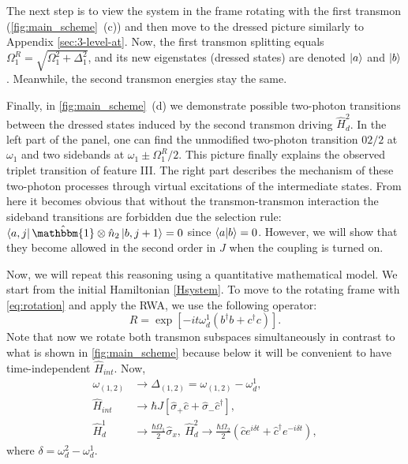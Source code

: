 \documentclass[%
 aps, prx,
 amsmath,amssymb,
 reprint,%
superscriptaddress
]{revtex4-2}
\begin{document}
The next step is to view the system in the frame 
rotating with the first transmon 
(\autoref{fig:main_scheme}~(c)) and then move to 
the  dressed picture similarly to Appendix 
\ref{sec:3-level-at}. Now, the first transmon 
splitting equals $\Omega_{1}^R = 
\sqrt{\Omega_1^2+\Delta_1^2}$, and its new 
eigenstates (dressed states) are denoted 
$\ket{a}$ and $\ket{b}$. Meanwhile, the second 
transmon energies stay the same.


Finally, in \autoref{fig:main_scheme}~(d) we demonstrate possible two-photon transitions between the dressed states induced by the second transmon driving $\hat H_{d}^2$. In the left part of the panel, one can find the unmodified two-photon transition $02/2$ at $\omega_1$ and two sidebands at $\omega_1 \pm \Omega_1^R/2$. This picture finally explains the observed triplet transition of feature III. The right part describes the mechanism of these two-photon processes through virtual excitations of the intermediate states. From here it becomes obvious that without the transmon-transmon interaction the sideband transitions are forbidden due the selection rule: $\bra{a,j}\hat{\mathbbm{1}}\otimes \hat n_2 \ket{b, j+1} = 0$ since $\braket{a}{b} = 0$. However, we will show that they become allowed in the second order in $J$ when the coupling is turned on.

Now, we will repeat this reasoning using a 
quantitative mathematical model. We start from 
the initial Hamiltonian \autoref{Hsystem}. To 
move to the rotating frame with 
\autoref{eq:rotation} and apply the RWA, we use 
the following operator:
\begin{equation}
R = \exp[-it \omega_d^1 
(b^{\dagger}b+c^{\dagger}c)].
\end{equation}  
Note that now we rotate both transmon subspaces simultaneously in contrast to what is shown in \autoref{fig:main_scheme} because below it will be convenient to have time-independent $\hat H_{int}$. Now,
\begin{equation}
\begin{aligned}
\omega_{(1,2)} &\rightarrow \Delta_{(1,2)} = \omega_{(1,2)} - \omega_d^{1},\\
\hat H_{int} &\rightarrow  \hbar J \left[\hat \sigma_+ \hat c + \hat \sigma_-\hat c^\dag \right],\\
\hat H_{d}^1 &\rightarrow \frac{\hbar \Omega_1}{2} \hat \sigma_x,\ 
\hat H_{d}^2 \rightarrow \frac{\hbar \Omega_2}{2}(\hat c e^{i\delta t}  + \hat c^\dag e^{-i\delta t}),
\end{aligned}
\end{equation}
where $\delta = \omega_{d}^2 - \omega_{d}^1$.
\end{document}
